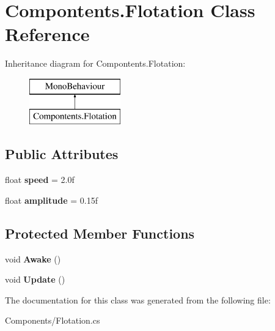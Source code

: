 \hypertarget{class_compontents_1_1_flotation}{}\section{Compontents.\+Flotation Class Reference}
\label{class_compontents_1_1_flotation}
Inheritance diagram for Compontents.\+Flotation\+:\begin{figure}[H]
\begin{center}
\leavevmode
\includegraphics[height=2.000000cm]{class_compontents_1_1_flotation}
\end{center}
\end{figure}
\subsection*{Public Attributes}
\begin{DoxyCompactItemize}
\item 
\mbox{\label{class_compontents_1_1_flotation_a5c8408eee79ac8f3a453b5836d0d9606}} 
float {\bfseries speed} = 2.\+0f
\item 
\mbox{\label{class_compontents_1_1_flotation_a96be09ed1b377241da7b570a26ffa8b4}} 
float {\bfseries amplitude} = 0.\+15f
\end{DoxyCompactItemize}
\subsection*{Protected Member Functions}
\begin{DoxyCompactItemize}
\item 
\mbox{\label{class_compontents_1_1_flotation_a319cc6dce2fec896ceab77e1266621a3}} 
void {\bfseries Awake} ()
\item 
\mbox{\label{class_compontents_1_1_flotation_a509ac8c96b88e59981df0d06113d2599}} 
void {\bfseries Update} ()
\end{DoxyCompactItemize}


The documentation for this class was generated from the following file\+:\begin{DoxyCompactItemize}
\item 
Components/Flotation.\+cs\end{DoxyCompactItemize}
